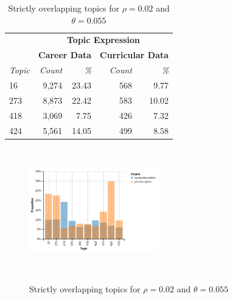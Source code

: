 \begin{table}
  \centering
  \begin{tabular}{l r r r r}
    & \multicolumn{4}{c}{\small{\textbf{Topic Expression}}} \\
    & \multicolumn{2}{c}{\small{\textbf{Career Data}}} & \multicolumn{2}{c}{\small{\textbf{Curricular Data}}} \\
    {\small\textit{Topic}} & {\small\textit{Count}} & {\small\textit{\%}} & {\small\textit{Count}} & {\small\textit{\%}} \\
    \hline
    16 & 9,274 & 23.43 & 568 & 9.77 \\
    273 & 8,873 & 22.42 & 583 & 10.02 \\
    418 & 3,069 & 7.75 & 426 & 7.32 \\
    424 & 5,561 & 14.05 & 499 & 8.58
  \end{tabular}
  \caption{Strictly overlapping topics for $\rho=0.02$ and $\theta=0.055$}~\label{tab:overlap}
\end{table}


\begin{figure}
  \centering
  \includegraphics[width=0.5\textwidth]{figs/strict-overlap}
  \caption{Strictly overlapping topics for $\rho=0.02$ and $\theta=0.055$}~\label{fig:overlap}
\end{figure}
